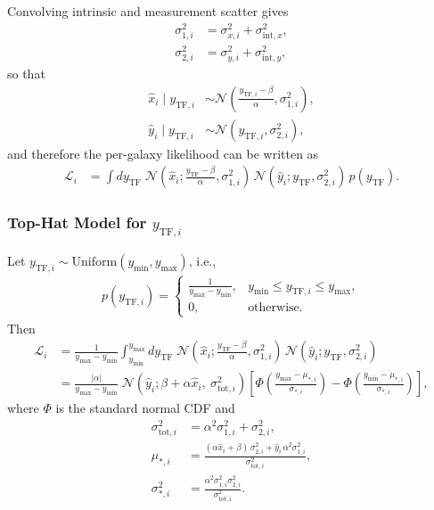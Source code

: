 Convolving intrinsic and measurement scatter gives
\begin{align}
\sigma_{1,i}^2 &= \sigma_{x,i}^2+\sigma_{\text{int},x}^2,\\
\sigma_{2,i}^2 &= \sigma_{y,i}^2+\sigma_{\text{int},y}^2,
\end{align}
so that
\begin{align}
\hat x_i \mid y_{\text{TF},i} &\sim \mathcal N\!\left(\frac{y_{\text{TF},i}-\beta}{\alpha},\sigma^2_{1,i}\right),\\
\hat y_i \mid y_{\text{TF},i} &\sim \mathcal N(y_{\text{TF},i},\sigma^2_{2,i}),
\end{align}
and therefore the per-galaxy likelihood can be written as
\begin{align}
\mathcal L_i
&= \int dy_{\text{TF}}\;
\mathcal N\!\left(\hat x_i;\frac{y_{\text{TF}}-\beta}{\alpha},\sigma^2_{1,i}\right)\,
\mathcal N\!\left(\hat y_i;y_{\text{TF}},\sigma^2_{2,i}\right)\,
p(y_{\text{TF}}).
\label{eqn:likelihood_pg}
\end{align}

\subsubsection{Top-Hat Model for $y_{\text{TF},i}$}
Let $y_{\text{TF},i}\sim\text{Uniform}(y_{\min},y_{\max})$, i.e.,
\begin{align}
p(y_{\text{TF},i})=
\begin{cases}
\frac{1}{y_{\max}-y_{\min}}, & y_{\min}\le y_{\text{TF},i}\le y_{\max},\\
0, & \text{otherwise}.
\end{cases}
\end{align}
Then
\begin{align}
\mathcal L_i
&= \frac{1}{y_{\max}-y_{\min}}
\int_{y_{\min}}^{y_{\max}} dy_{\text{TF}}\;
\mathcal N\!\left(\hat x_i;\frac{y_{\text{TF}}-\beta}{\alpha},\sigma^2_{1,i}\right)\,
\mathcal N\!\left(\hat y_i;y_{\text{TF}},\sigma^2_{2,i}\right)\\
&= \frac{|\alpha|}{y_{\max}-y_{\min}}\;
\mathcal N\!\left(\hat y_i; \beta+\alpha\hat x_i,\ \sigma^2_{\text{tot},i}\right)
\left[
\Phi\!\left(\frac{y_{\max}-\mu_{*,i}}{\sigma_{*,i}}\right)
-
\Phi\!\left(\frac{y_{\min}-\mu_{*,i}}{\sigma_{*,i}}\right)
\right],
\end{align}
where $\Phi$ is the standard normal CDF and
\begin{align}
\sigma_{\text{tot},i}^2 &= \alpha^2\sigma_{1,i}^2+\sigma_{2,i}^2,\\
\mu_{*,i} &= \frac{(\alpha\hat x_i+\beta)\,\sigma_{2,i}^2+\hat y_i\,\alpha^2\sigma_{1,i}^2}{\sigma_{\text{tot},i}^2},\\
\sigma_{*,i}^2 &= \frac{\alpha^2\sigma_{1,i}^2\sigma_{2,i}^2}{\sigma_{\text{tot},i}^2}.
\end{align}

